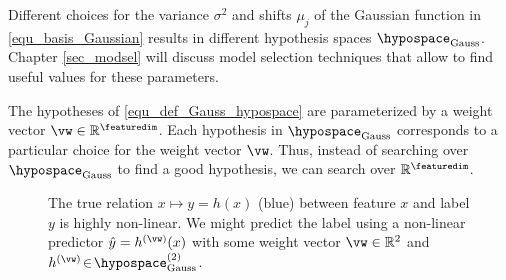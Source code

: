 \documentclass[12pt]{report}
\begin{document}
Different choices for the variance $\sigma^{2}$ and shifts $\mu_{j}$ 
of the Gaussian function in \eqref{equ_basis_Gaussian} results in 
different hypothesis spaces $\hypospace_{\rm Gauss}$. Chapter \ref{sec_modsel} 
will discuss model selection techniques that allow to find useful values 
for these parameters.

The hypotheses of \eqref{equ_def_Gauss_hypospace} are parameterized 
by a weight vector $\vw \in \mathbb{R}^{\featuredim}$. Each hypothesis 
 in $\hypospace_{\rm Gauss}$ corresponds to a particular choice 
for the weight vector $\vw$. Thus, instead of searching over $\hypospace_{\rm Gauss}$ 
to find a good hypothesis, we can search over $\mathbb{R}^{\featuredim}$.


\begin{figure}[htbp]
\begin{center}
     \vspace*{-10mm}
\end{center}\caption{The true relation $x \mapsto y=h(x)$ (blue) between feature $x$ and label $y$ is highly non-linear. We might predict 
the label using a non-linear predictor $\hat{y}=h^{(\vw)}(x)$ with some weight vector $\vw \in \mathbb{R}^{2}$ and $h^{(\vw)} \!\in\!\hypospace^{(2)}_{\rm Gauss}$.} 
\label{fig_lin_bas_expansion}
\end{figure}
\end{document}
